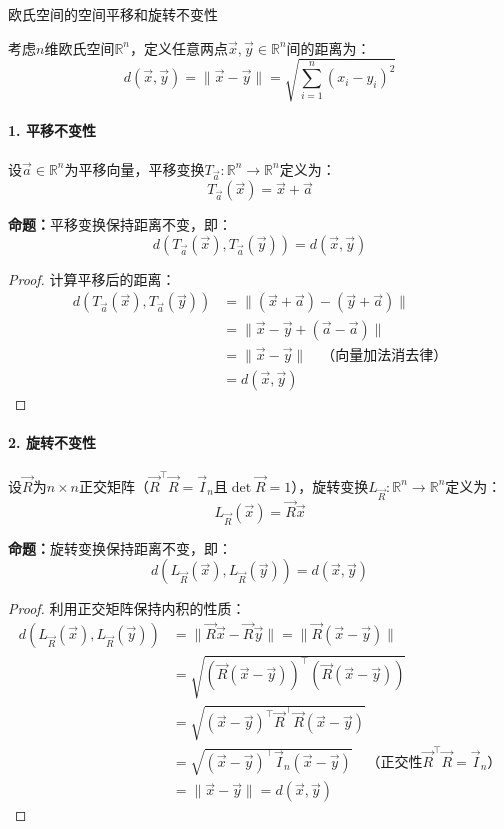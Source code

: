 \documentclass[12pt, a4paper, oneside, UTF8]{ctexbook}  %
\begin{document}
\begin{thm}
欧氏空间的空间平移和旋转不变性

考虑$n$维欧氏空间$\mathbb{R}^n$，定义任意两点$\vec{x}, \vec{y} \in \mathbb{R}^n$间的距离为：
\[
d(\vec{x}, \vec{y}) = \|\vec{x} - \vec{y}\| = \sqrt{\sum_{i=1}^n (x_i - y_i)^2}
\]

\paragraph{1. 平移不变性}

设$\vec{a} \in \mathbb{R}^n$为平移向量，平移变换$T_{\vec{a}}: \mathbb{R}^n \to \mathbb{R}^n$定义为：
\[
T_{\vec{a}}(\vec{x}) = \vec{x} + \vec{a}
\]

\textbf{命题：}平移变换保持距离不变，即：
\[
d(T_{\vec{a}}(\vec{x}), T_{\vec{a}}(\vec{y})) = d(\vec{x}, \vec{y})
\]

\begin{proof}
计算平移后的距离：
\begin{align*}
d(T_{\vec{a}}(\vec{x}), T_{\vec{a}}(\vec{y})) 
&= \|(\vec{x} + \vec{a}) - (\vec{y} + \vec{a})\| \\
&= \|\vec{x} - \vec{y} + (\vec{a} - \vec{a})\| \\
&= \|\vec{x} - \vec{y}\| \quad \text{（向量加法消去律）} \\
&= d(\vec{x}, \vec{y})
\end{align*}
\end{proof}

\paragraph{2. 旋转不变性}

设$\vec{R}$为$n \times n$正交矩阵（$\vec{R}^\top \vec{R} = \vec{I}_n$且$\det \vec{R} = 1$），旋转变换$L_{\vec{R}}: \mathbb{R}^n \to \mathbb{R}^n$定义为：
\[
L_{\vec{R}}(\vec{x}) = \vec{R}\vec{x}
\]

\textbf{命题：}旋转变换保持距离不变，即：
\[
d(L_{\vec{R}}(\vec{x}), L_{\vec{R}}(\vec{y})) = d(\vec{x}, \vec{y})
\]

\begin{proof}
利用正交矩阵保持内积的性质：
\begin{align*}
d(L_{\vec{R}}(\vec{x}), L_{\vec{R}}(\vec{y}))
&= \|\vec{R}\vec{x} - \vec{R}\vec{y}\|= \|\vec{R}(\vec{x} - \vec{y})\| \\
&= \sqrt{(\vec{R}(\vec{x} - \vec{y}))^\top (\vec{R}(\vec{x} - \vec{y}))} \\
&= \sqrt{(\vec{x} - \vec{y})^\top \vec{R}^\top \vec{R}(\vec{x} - \vec{y})} \\
&= \sqrt{(\vec{x} - \vec{y})^\top \vec{I}_n (\vec{x} - \vec{y})} \quad \text{（正交性$\vec{R}^\top \vec{R} = \vec{I}_n$）} \\
&= \|\vec{x} - \vec{y}\|= d(\vec{x}, \vec{y})
\end{align*}
\end{proof}
\end{thm}
\end{document}

